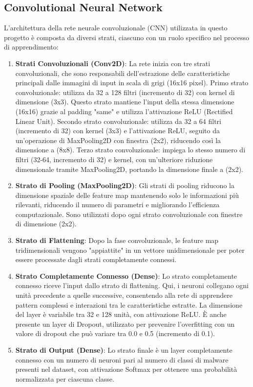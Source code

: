 
\subsection{Convolutional Neural Network}
L'architettura della rete neurale convoluzionale (CNN) utilizzata in questo progetto è composta da diversi strati, ciascuno con un ruolo specifico nel processo di apprendimento:
\begin{enumerate}
    \item \textbf{Strati Convoluzionali (Conv2D)}:
    La rete inizia con tre strati convoluzionali, che sono responsabili dell'estrazione delle caratteristiche principali dalle immagini di input in scala di grigi (16x16 pixel).
    Primo strato convoluzionale: utilizza da 32 a 128 filtri (incremento di 32) con kernel di dimensione (3x3). Questo strato mantiene l'input della stessa dimensione (16x16) grazie al padding "same" e utilizza l'attivazione ReLU (Rectified Linear Unit).
    Secondo strato convoluzionale: utilizza da 32 a 64 filtri (incremento di 32) con kernel (3x3) e l'attivazione ReLU, seguito da un'operazione di MaxPooling2D con finestra (2x2), riducendo così la dimensione a (8x8).
    Terzo strato convoluzionale: impiega lo stesso numero di filtri (32-64, incremento di 32) e kernel, con un'ulteriore riduzione dimensionale tramite MaxPooling2D, portando la dimensione finale a (2x2).
    \item \textbf{Strato di Pooling (MaxPooling2D)}:
    Gli strati di pooling riducono la dimensione spaziale delle feature map mantenendo solo le informazioni più rilevanti, riducendo il numero di parametri e migliorando l'efficienza computazionale.
    Sono utilizzati dopo ogni strato convoluzionale con finestre di dimensione (2x2).
    \item \textbf{Strato di Flattening}:
    Dopo la fase convoluzionale, le feature map tridimensionali vengono "appiattite" in un vettore unidimensionale per poter essere processate dagli strati completamente connessi.
    \item \textbf{Strato Completamente Connesso (Dense)}:
    Lo strato completamente connesso riceve l'input dallo strato di flattening. Qui, i neuroni collegano ogni unità precedente a quelle successive, consentendo alla rete di apprendere pattern complessi e interazioni tra le caratteristiche estratte.
    La dimensione del layer è variabile tra 32 e 128 unità, con attivazione ReLU. È anche presente un layer di Dropout, utilizzato per prevenire l'overfitting con un valore di dropout che può variare tra 0.0 e 0.5 (incremento di 0.1).
    \item \textbf{Strato di Output (Dense)}:
    Lo strato finale è un layer completamente connesso con un numero di neuroni pari al numero di classi di malware presenti nel dataset, con attivazione Softmax per ottenere una probabilità normalizzata per ciascuna classe.
\end{enumerate}

